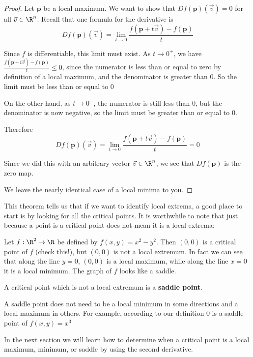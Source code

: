 \documentclass{ximera}
\begin{document}
	\begin{proof}
		Let $\mathbf{p}$ be a local maximum.  We want to show that $Df(\mathbf{p})(\vec{v}) = 0$ for all $\vec{v} \in \R^n$.  Recall that one formula for the derivative is
		\[
		Df(\mathbf{p})(\vec{v}) = \displaystyle\lim_{t \to 0} \frac{f(\mathbf{p}+t\vec{v}) - f(\mathbf{p})}{t}
		\]
		
		Since $f$ is differentiable, this limit must exist.  As $t \to 0^+$, we have $\frac{f(\mathbf{p}+t\vec{v}) - f(\mathbf{p})}{t} \leq 0$, since the numerator is less than or
		equal to zero by definition of a local maximum, and the denominator is greater than $0$.  So the limit must be less than or equal to $0$
		
		On the other hand, as $t \to 0^-$, the numerator is still less than $0$, but the denominator is now negative, so the limit must be greater than or equal to $0$.
		
		Therefore 
		\[
		Df(\mathbf{p})(\vec{v}) = \displaystyle\lim_{t \to 0} \frac{f(\mathbf{p}+t\vec{v}) - f(\mathbf{p})}{t} = 0
		\]
		
		Since we did this with an arbitrary vector $\vec{v} \in \R^n$, we see that $Df(\mathbf{p})$ is the zero map.
		
		We leave the nearly identical case of a local minima to you.
	\end{proof}
	
	
	This theorem tells us that if we want to identify local extrema, a good place to start is by looking for all the critical points.  It is worthwhile to note
	that just because a point is a critical point does not mean it is a local extrema:
	
	\begin{example}
		Let $f:\R^2 \to \R$ be defined by $f(x,y) = x^2-y^2$.  Then $(0,0)$ is a critical point of $f$ (check this!), but $(0,0)$ is not a local extremum.  In fact we can see
		that along the line $y=0$, $(0,0)$ is a local maximum, while along the line $x=0$ it is a local minimum.  The graph of $f$ looks like a saddle. 
	\end{example}
	
	\begin{definition}
		A critical point which is not a local extremum is a \textbf{saddle point}.
	\end{definition}
	
	\begin{warning}
		A saddle point does not need to be a local minimum in some directions and a local maximum in others.  For example, according to our definition
		$0$ is a saddle point of $f(x,y)  = x^3$
	\end{warning}
	
	In the next section we will learn how to determine when a critical point is a local maximum, minimum, or saddle by using the second derivative.
	
	
	
	
\end{document}
